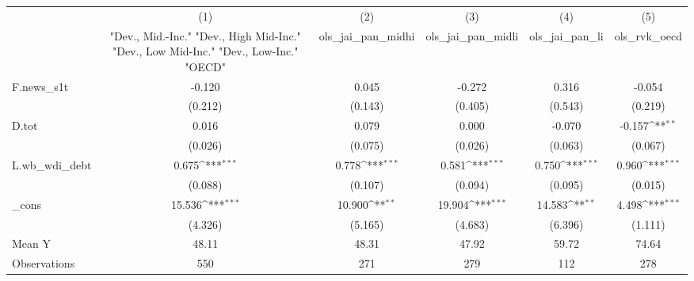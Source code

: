 {
\def\sym#1{\ifmmode^{#1}\else\(^{#1}\)\fi}
\begin{tabular}{l*{5}{c}}
\toprule
            &\multicolumn{1}{c}{(1)}&\multicolumn{1}{c}{(2)}&\multicolumn{1}{c}{(3)}&\multicolumn{1}{c}{(4)}&\multicolumn{1}{c}{(5)}\\
            &\multicolumn{1}{c}{ "Dev., Mid.-Inc." "Dev., High Mid-Inc." "Dev., Low Mid-Inc." "Dev., Low-Inc." "OECD" }&\multicolumn{1}{c}{ols\_jai\_pan\_midhi}&\multicolumn{1}{c}{ols\_jai\_pan\_midli}&\multicolumn{1}{c}{ols\_jai\_pan\_li}&\multicolumn{1}{c}{ols\_rvk\_oecd}\\
\midrule
F.news\_s1t  &      -0.120         &       0.045         &      -0.272         &       0.316         &      -0.054         \\
            &     (0.212)         &     (0.143)         &     (0.405)         &     (0.543)         &     (0.219)         \\
\addlinespace
D.tot       &       0.016         &       0.079         &       0.000         &      -0.070         &      -0.157\sym{**} \\
            &     (0.026)         &     (0.075)         &     (0.026)         &     (0.063)         &     (0.067)         \\
\addlinespace
L.wb\_wdi\_debt&       0.675\sym{***}&       0.778\sym{***}&       0.581\sym{***}&       0.750\sym{***}&       0.960\sym{***}\\
            &     (0.088)         &     (0.107)         &     (0.094)         &     (0.095)         &     (0.015)         \\
\addlinespace
\_cons      &      15.536\sym{***}&      10.900\sym{**} &      19.904\sym{***}&      14.583\sym{**} &       4.498\sym{***}\\
            &     (4.326)         &     (5.165)         &     (4.683)         &     (6.396)         &     (1.111)         \\
\midrule
Mean Y      &       48.11         &       48.31         &       47.92         &       59.72         &       74.64         \\
Observations&         550         &         271         &         279         &         112         &         278         \\
\bottomrule
\end{tabular}
}
